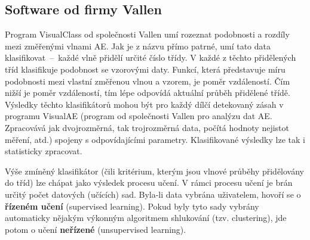 
\subsection{Software od firmy Vallen}
Program VisualClass od společnosti Vallen
 umí rozeznat podobnosti a rozdíly 
 mezi změřenými vlnami AE. Jak je z názvu přímo patrné, umí tato data klasifikovat~–~každé vlně přidělí určité číslo třídy. V každé z těchto přidělených tříd klasifikuje podobnost se vzorovými 
daty. Funkcí, která představuje míru podobnosti mezi vlastní změřenou vlnou a vzorem, je poměr vzdáleností. Čím nižší je poměr vzdáleností, tím lépe odpovídá aktuální průběh přidělené třídě. Výsledky těchto klasifikátorů mohou být pro každý dílčí detekovaný zásah v programu VisualAE (program od společnosti Vallen pro analýzu dat AE. Zpracovává jak dvojrozměrná, tak trojrozměrná data, počítá hodnoty nejistot měření, atd.) spojeny s odpovídajícími parametry. Klasifikované výsledky lze tak i statisticky zpracovat.

Výše zmíněný klasifikátor (čili kritérium, kterým jsou vlnové průběhy přidělovány do tříd) lze chápat jako výsledek procesu učení. V rámci procesu učení je brán určitý počet datových (učících) sad. Byla-li data vybrána uživatelem, hovoří se o \textbf{řízeném učení} (supervised learning). Pokud byly tyto sady vybrány automaticky nějakým výkonným algoritmem shlukování (tzv. clustering), jde potom o učení \textbf{neřízené} (unsupervised learning).

